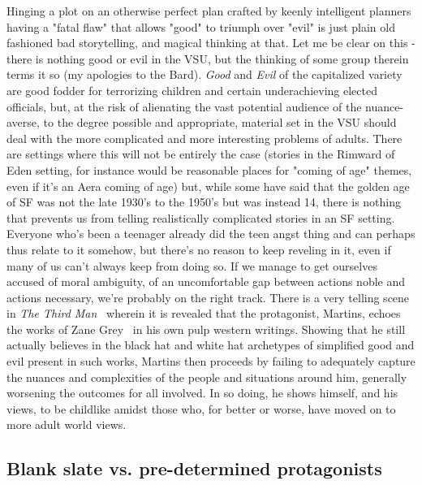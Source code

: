 Hinging a plot on an otherwise perfect plan crafted by keenly
intelligent planners having a "fatal flaw" that allows "good" to
triumph over "evil" is just plain old fashioned bad storytelling, and
magical thinking at that. Let me be clear on this - there is nothing
good or evil in the VSU, but the thinking of some group therein terms
it so (my apologies to the Bard).  \emph{Good} and \emph{Evil} of the
capitalized variety are good fodder for terrorizing children and
certain underachieving elected officials, but, at the risk of
alienating the vast potential audience of the nuance-averse, to the
degree possible and appropriate, material set in the VSU should deal
with the more complicated and more interesting problems of
adults. There are settings where this will not be entirely the case
(stories in the Rimward of Eden setting, for instance would be
reasonable places for "coming of age" themes, even if it's an Aera
coming of age) but, while some have said that the golden age of SF was
not the late 1930's to the 1950's but was instead 14, there is nothing that
prevents us from telling realistically complicated stories in an SF
setting. Everyone who's been a teenager already did the teen angst
thing and can perhaps thus relate to it somehow, but there's no reason
to keep reveling in it, even if many of us can't always keep from
doing so. If we manage to get ourselves accused of moral ambiguity, of
an uncomfortable gap between actions noble and actions necessary,
we're probably on the right track. There is a very telling scene in
\emph{The Third Man}~\cite{ThirdMan} wherein it is revealed that the
protagonist, Martins, echoes the works of Zane Grey~\cite{ZaneGrey} in
his own pulp western writings. Showing that he still actually believes
in the black hat and white hat archetypes of simplified good and evil
present in such works, Martins then proceeds by failing to adequately
capture the nuances and complexities of the people and situations
around him, generally worsening the outcomes for all involved. In so
doing, he shows himself, and his views, to be childlike amidst those
who, for better or worse, have moved on to more adult world views.

\subsection{Blank slate vs. pre-determined protagonists}

